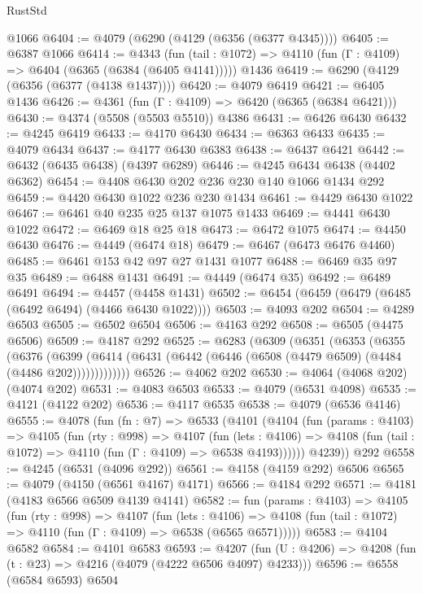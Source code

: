 \begin{lexlean}{RustStd}
\begin{coremodule}
{\begin{coremodule}
{{{{{{{{{{{{{{    @1066
@6404 := @4079 (@6290 (@4129 (@6356 (@6377 @4345))))
@6405 := @6387 @1066
@6414 := @4343
    (fun (tail : @1072) => @4110 (fun (Γ : @4109) => @6404 (@6365 (@6384 (@6405 @4141)))))
    @1436
@6419 := @6290 (@4129 (@6356 (@6377 (@4138 @1437))))
@6420 := @4079 @6419
@6421 := @6405 @1436
@6426 := @4361 (fun (Γ : @4109) => @6420 (@6365 (@6384 @6421)))
@6430 := @4374 (@5508 (@5503 @5510)) @4386
@6431 := @6426 @6430
@6432 := @4245 @6419
@6433 := @4170 @6430
@6434 := @6363 @6433
@6435 := @4079 @6434
@6437 := @4177 @6430 @6383
@6438 := @6437 @6421
@6442 := @6432 (@6435 @6438) (@4397 @6289)
@6446 := @4245 @6434 @6438 (@4402 @6362)
@6454 := @4408 @6430 @202 @236 @230 @140 @1066 @1434 @292
@6459 := @4420 @6430 @1022 @236 @230 @1434
@6461 := @4429 @6430 @1022
@6467 := @6461 @40 @235 @25 @137 @1075 @1433
@6469 := @4441 @6430 @1022
@6472 := @6469 @18 @25 @18
@6473 := @6472 @1075
@6474 := @4450 @6430
@6476 := @4449 (@6474 @18)
@6479 := @6467 (@6473 @6476 @4460)
@6485 := @6461 @153 @42 @97 @27 @1431 @1077
@6488 := @6469 @35 @97 @35
@6489 := @6488 @1431
@6491 := @4449 (@6474 @35)
@6492 := @6489 @6491
@6494 := @4457 (@4458 @1431)
@6502 := @6454 (@6459 (@6479 (@6485 (@6492 @6494) (@4466 @6430 @1022))))
@6503 := @4093 @202
@6504 := @4289 @6503
@6505 := @6502 @6504
@6506 := @4163 @292
@6508 := @6505 (@4475 @6506)
@6509 := @4187 @292
@6525 := @6283
    (@6309
      (@6351
        (@6353
          (@6355
            (@6376
              (@6399
                (@6414 (@6431 (@6442 (@6446 (@6508 (@4479 @6509) (@4484 (@4486 @202)))))))))))))
@6526 := @4062 @202
@6530 := @4064 (@4068 @202) (@4074 @202)
@6531 := @4083 @6503
@6533 := @4079 (@6531 @4098)
@6535 := @4121 (@4122 @202)
@6536 := @4117 @6535
@6538 := @4079 (@6536 @4146)
@6555 := @4078
    (fun (fn : @7) =>
    @6533
      (@4101
        (@4104
          (fun (params : @4103) =>
          @4105
            (fun (rty : @998) =>
            @4107
              (fun (lets : @4106) =>
              @4108 (fun (tail : @1072) => @4110 (fun (Γ : @4109) => @6538 @4193))))))
        @4239))
    @292
@6558 := @4245 (@6531 (@4096 @292))
@6561 := @4158 (@4159 @292) @6506
@6565 := @4079 (@4150 (@6561 @4167) @4171)
@6566 := @4184 @292
@6571 := @4181 (@4183 @6566 @6509 @4139 @4141)
@6582 := fun (params : @4103) =>
  @4105
    (fun (rty : @998) =>
    @4107
      (fun (lets : @4106) =>
      @4108 (fun (tail : @1072) => @4110 (fun (Γ : @4109) => @6538 (@6565 @6571)))))
@6583 := @4104 @6582
@6584 := @4101 @6583
@6593 := @4207 (fun (U : @4206) => @4208 (fun (t : @23) => @4216 (@4079 (@4222 @6506 @4097) @4233)))
@6596 := @6558 (@6584 @6593) @6504
}}}}}}}}}}}}}}
\end{coremodule}}
\end{coremodule}
\end{lexlean}
